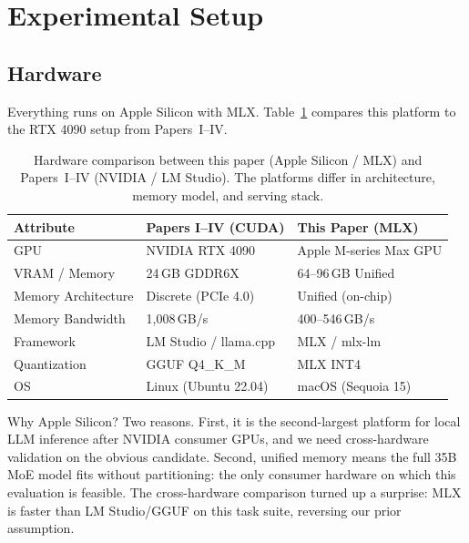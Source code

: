 \documentclass[11pt]{article}
\begin{document}
\section{Experimental Setup}
\label{sec:experimental-setup}

\subsection{Hardware}
\label{sec:hardware}

Everything runs on Apple Silicon with MLX.  Table~\ref{tab:hardware} compares this platform to the RTX 4090 setup from Papers~I--IV.

\begin{table}[t]
\centering
\caption{Hardware comparison between this paper (Apple Silicon / MLX) and Papers~I--IV (NVIDIA / LM Studio).  The platforms differ in architecture, memory model, and serving stack.}
\label{tab:hardware}
\small
\begin{tabular}{lll}
\toprule
\textbf{Attribute} & \textbf{Papers I--IV (CUDA)} & \textbf{This Paper (MLX)} \\
\midrule
GPU & NVIDIA RTX 4090 & Apple M-series Max GPU \\
VRAM / Memory & 24\,GB GDDR6X & 64--96\,GB Unified \\
Memory Architecture & Discrete (PCIe 4.0) & Unified (on-chip) \\
Memory Bandwidth & 1,008\,GB/s & 400--546\,GB/s \\
Framework & LM Studio / llama.cpp & MLX / mlx-lm \\
Quantization & GGUF Q4\_K\_M & MLX INT4 \\
OS & Linux (Ubuntu 22.04) & macOS (Sequoia 15) \\
\bottomrule
\end{tabular}
\end{table}

Why Apple Silicon? Two reasons.  First, it is the second-largest platform for local LLM inference after NVIDIA consumer GPUs, and we need cross-hardware validation on the obvious candidate.  Second, unified memory means the full 35B MoE model fits without partitioning: the only consumer hardware on which this evaluation is feasible.  The cross-hardware comparison turned up a surprise: MLX is faster than LM Studio/GGUF on this task suite, reversing our prior assumption.
\end{document}
